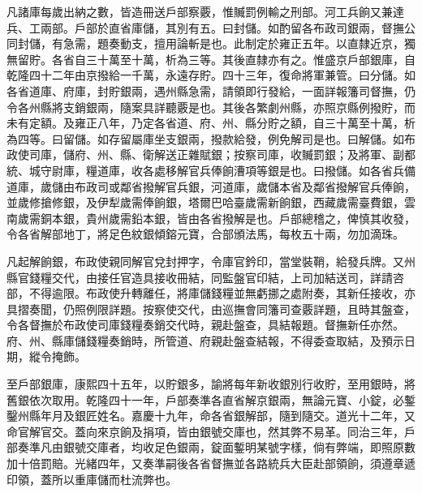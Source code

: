 \begin{pinyinscope}
凡諸庫每歲出納之數，皆造冊送戶部察覈，惟贓罰例輸之刑部。河工兵餉又兼達兵、工兩部。戶部於直省庫儲，其別有五。曰封儲。如酌留各布政司銀兩，督撫公同封儲，有急需，題奏動支，擅用論斬是也。此制定於雍正五年。以直隸近京，獨無留貯。各省自三十萬至十萬，析為三等。其後直隸亦有之。惟盛京戶部銀庫，自乾隆四十二年由京撥給一千萬，永遠存貯。四十三年，復命將軍兼管。曰分儲。如各省道庫、府庫，封貯銀兩，遇州縣急需，請領即行發給，一面詳報籓司督撫，仍令各州縣將支銷銀兩，隨案具詳聽覈是也。其後各繁劇州縣，亦照京縣例撥貯，而未有定額。及雍正八年，乃定各省道、府、州、縣分貯之額，自三十萬至十萬，析為四等。曰留儲。如存留屬庫坐支銀兩，撥款給發，例免解司是也。曰解儲。如布政使司庫，儲府、州、縣、衛解送正雜賦銀；按察司庫，收贓罰銀；及將軍、副都統、城守尉庫，糧道庫，收各處移解官兵俸餉漕項等銀是也。曰撥儲。如各省兵備道庫，歲儲由布政司或鄰省撥解官兵銀，河道庫，歲儲本省及鄰省撥解官兵俸餉，並歲修搶修銀，及伊犁歲需俸餉銀，塔爾巴哈臺歲需新餉銀，西藏歲需臺費銀，雲南歲需銅本銀，貴州歲需鉛本銀，皆由各省撥解是也。戶部總稽之，俾慎其收發，令各省解部地丁，將足色紋銀傾鎔元寶，合部頒法馬，每枚五十兩，勿加滴珠。

凡起解餉銀，布政使親同解官兌封押字，令庫官鈐印，當堂裝鞘，給發兵牌。又州縣官錢糧交代，由接任官造具接收冊結，同監盤官印結，上司加結送司，詳請咨部，不得逾限。布政使升轉離任，將庫儲錢糧並無虧挪之處附奏，其新任接收，亦具摺奏聞，仍照例限詳題。按察使交代，由巡撫會同籓司查覈詳題，且時其盤查，令各督撫於布政使司庫錢糧奏銷交代時，親赴盤查，具結報題。督撫新任亦然。府、州、縣庫儲錢糧奏銷時，所管道、府親赴盤查結報，不得委查取結，及預示日期，縱令掩飾。

至戶部銀庫，康熙四十五年，以貯銀多，諭將每年新收銀別行收貯，至用銀時，將舊銀依次取用。乾隆四十一年，戶部奏準各直省解京銀兩，無論元寶、小錠，必鏨鑿州縣年月及銀匠姓名。嘉慶十九年，命各省銀解部，隨到隨交。道光十二年，又命官解官交。蓋向來京餉及捐項，皆由銀號交庫也，然其弊不易革。同治三年，戶部奏準凡由銀號交庫者，均收足色銀兩，錠面鏨明某號字樣，倘有弊端，即照原數加十倍罰賠。光緒四年，又奏準嗣後各省督撫並各路統兵大臣赴部領餉，須遵章遞印領，蓋所以重庫儲而杜流弊也。


\end{pinyinscope}
